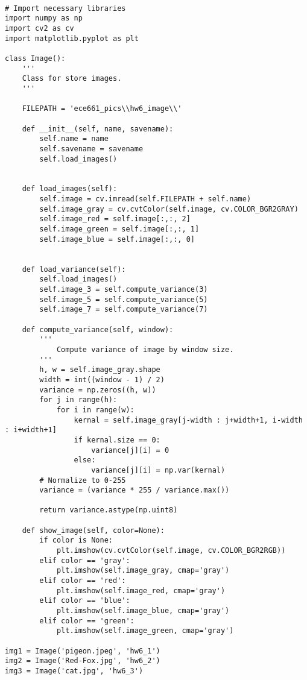 \documentclass[11pt]{article}
\begin{document}
\begin{lstlisting}

# Import necessary libraries
import numpy as np
import cv2 as cv
import matplotlib.pyplot as plt

class Image():
    ''' 
    Class for store images.
    '''

    FILEPATH = 'ece661_pics\\hw6_image\\'

    def __init__(self, name, savename):
        self.name = name
        self.savename = savename
        self.load_images()
        

    def load_images(self):
        self.image = cv.imread(self.FILEPATH + self.name)
        self.image_gray = cv.cvtColor(self.image, cv.COLOR_BGR2GRAY)
        self.image_red = self.image[:,:, 2]
        self.image_green = self.image[:,:, 1]
        self.image_blue = self.image[:,:, 0]
        
    
    def load_variance(self):
        self.load_images()
        self.image_3 = self.compute_variance(3)
        self.image_5 = self.compute_variance(5)
        self.image_7 = self.compute_variance(7)

    def compute_variance(self, window):
        ''' 
            Compute variance of image by window size.
        '''
        h, w = self.image_gray.shape
        width = int((window - 1) / 2)
        variance = np.zeros((h, w))
        for j in range(h):
            for i in range(w):
                kernal = self.image_gray[j-width : j+width+1, i-width : i+width+1]
                if kernal.size == 0:
                    variance[j][i] = 0
                else:
                    variance[j][i] = np.var(kernal)
        # Normalize to 0-255
        variance = (variance * 255 / variance.max())

        return variance.astype(np.uint8)

    def show_image(self, color=None):
        if color is None:
            plt.imshow(cv.cvtColor(self.image, cv.COLOR_BGR2RGB))
        elif color == 'gray':
            plt.imshow(self.image_gray, cmap='gray')
        elif color == 'red':
            plt.imshow(self.image_red, cmap='gray')
        elif color == 'blue':
            plt.imshow(self.image_blue, cmap='gray')
        elif color == 'green':
            plt.imshow(self.image_green, cmap='gray')      

img1 = Image('pigeon.jpeg', 'hw6_1')   
img2 = Image('Red-Fox.jpg', 'hw6_2') 
img3 = Image('cat.jpg', 'hw6_3')


\end{lstlisting}
\end{document}
